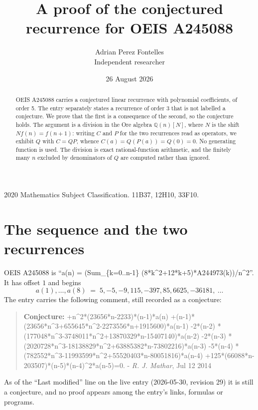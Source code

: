 \documentclass[11pt,a4paper]{article}
\title{A proof of the conjectured recurrence for OEIS A245088}
\author{Adrian Perez Fontelles\\ \small Independent researcher}
\date{26 August 2026}
\theoremstyle{plain}
\theoremstyle{definition}
\begin{document}
\maketitle

\begin{abstract}
OEIS A245088 carries a conjectured linear recurrence with polynomial coefficients, of
order 5. The entry separately states a recurrence of order 3 that is not
labelled a conjecture. We prove that the first is a consequence of the second, so the
conjecture holds. The argument is a division in the Ore algebra
$\mathbb{Q}(n)[N]$, where $N$ is the shift $Nf(n)=f(n+1)$: writing $C$ and $P$ for the two
recurrences read as operators, we exhibit $Q$ with $C=QP$, whence
$C(a)=Q(P(a))=Q(0)=0$. No generating function is used. The division is exact
rational-function arithmetic, and the finitely many $n$ excluded by denominators of $Q$
are computed rather than ignored.
\end{abstract}

\noindent\small 2020 Mathematics Subject Classification. 11B37, 12H10, 33F10.\normalsize

\section{The sequence and the two recurrences}

OEIS A245088 is ``a(n) = (Sum\_\{k=0..n-1\} (8*k\textasciicircum{}2+12*k+5)*A244973(k))/n\textasciicircum{}2''. It has offset $1$ and begins
\[
a(1),\dots,a(8)\;=\;5, -5, -9, 115, -397, 85, 6625, -36181,\ \dots
\]
The entry carries the following comment, still recorded as a conjecture:
\begin{quote}\small
\textbf{Conjecture:} +n\textasciicircum{}2*(23656*n-2233)*(n-1)*a(n) +(n-1)*(23656*n\textasciicircum{}3+655645*n\textasciicircum{}2-2273556*n+1915600)*a(n-1) -2*(n-2) *(177048*n\textasciicircum{}3-3748011*n\textasciicircum{}2+13870329*n-15407140)*a(n-2) -2*(n-3) *(2020728*n\textasciicircum{}3-18138829*n\textasciicircum{}2+63885382*n-73802216)*a(n-3) -5*(n-4) *(782552*n\textasciicircum{}3-11993599*n\textasciicircum{}2+55520403*n-80051816)*a(n-4) +125*(66088*n-203507)*(n-5)*(n-4)\textasciicircum{}2*a(n-5)=0. - \emph{R. J. Mathar}, Jul 12 2014
\end{quote}
As of the ``Last modified'' line on the live entry (2026-05-30, revision 29) it is still
a conjecture, and no proof appears among the entry's links, formulas or programs.
\end{document}
